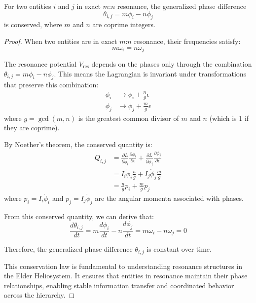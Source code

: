 \begin{theorem}
For two entities $i$ and $j$ in exact $m$:$n$ resonance, the generalized phase difference
\begin{equation}
\theta_{i,j} = m\phi_i - n\phi_j
\end{equation}
is conserved, where $m$ and $n$ are coprime integers.
\end{theorem}

\begin{proof}
When two entities are in exact $m$:$n$ resonance, their frequencies satisfy:
\begin{equation}
m\omega_i = n\omega_j
\end{equation}

The resonance potential $V_{\text{res}}$ depends on the phases only through the combination $\theta_{i,j} = m\phi_i - n\phi_j$. This means the Lagrangian is invariant under transformations that preserve this combination:
\begin{align}
\phi_i &\to \phi_i + \frac{n}{g}\epsilon \\
\phi_j &\to \phi_j + \frac{m}{g}\epsilon
\end{align}
where $g = \gcd(m,n)$ is the greatest common divisor of $m$ and $n$ (which is 1 if they are coprime).

By Noether's theorem, the conserved quantity is:
\begin{align}
Q_{i,j} &= \frac{\partial L}{\partial \dot{\phi}_i} \frac{\partial \phi_i}{\partial \epsilon} + \frac{\partial L}{\partial \dot{\phi}_j} \frac{\partial \phi_j}{\partial \epsilon} \\
&= I_i \dot{\phi}_i \frac{n}{g} + I_j \dot{\phi}_j \frac{m}{g} \\
&= \frac{n}{g} p_i + \frac{m}{g} p_j
\end{align}
where $p_i = I_i \dot{\phi}_i$ and $p_j = I_j \dot{\phi}_j$ are the angular momenta associated with phases.

From this conserved quantity, we can derive that:
\begin{equation}
\frac{d\theta_{i,j}}{dt} = m\frac{d\phi_i}{dt} - n\frac{d\phi_j}{dt} = m\omega_i - n\omega_j = 0
\end{equation}

Therefore, the generalized phase difference $\theta_{i,j}$ is constant over time.

This conservation law is fundamental to understanding resonance structures in the Elder Heliosystem. It ensures that entities in resonance maintain their phase relationships, enabling stable information transfer and coordinated behavior across the hierarchy.
\end{proof}

